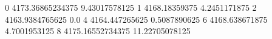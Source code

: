 0 4173.36865234375 9.43017578125
1 4168.18359375 4.2451171875
2 4163.9384765625 0.0
4 4164.447265625 0.5087890625
6 4168.638671875 4.7001953125
8 4175.16552734375 11.22705078125

